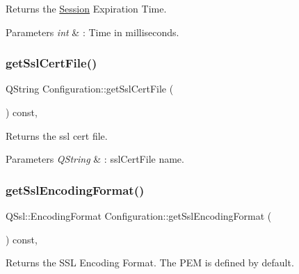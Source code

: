 Returns the \hyperlink{class_session}{Session} Expiration Time. 


\begin{DoxyParams}{Parameters}
{\em int} & \+: Time in milliseconds. \\
\hline
\end{DoxyParams}
\mbox{\label{class_configuration_a7d58b7b13992eb1ce0789b9442ff663c}} 
\subsubsection{\texorpdfstring{get\+Ssl\+Cert\+File()}{getSslCertFile()}}
{\footnotesize\ttfamily Q\+String Configuration\+::get\+Ssl\+Cert\+File (\begin{DoxyParamCaption}{ }\end{DoxyParamCaption}) const\hspace{0.3cm}{\ttfamily [inline]}, {\ttfamily [noexcept]}}



Returns the ssl cert file. 


\begin{DoxyParams}{Parameters}
{\em Q\+String} & \+: ssl\+Cert\+File name. \\
\hline
\end{DoxyParams}
\mbox{\label{class_configuration_aa839f957ac9af33187140649b38785ef}} 
\subsubsection{\texorpdfstring{get\+Ssl\+Encoding\+Format()}{getSslEncodingFormat()}}
{\footnotesize\ttfamily Q\+Ssl\+::\+Encoding\+Format Configuration\+::get\+Ssl\+Encoding\+Format (\begin{DoxyParamCaption}{ }\end{DoxyParamCaption}) const\hspace{0.3cm}{\ttfamily [inline]}, {\ttfamily [noexcept]}}



Returns the S\+SL Encoding Format. The P\+EM is defined by default. 


